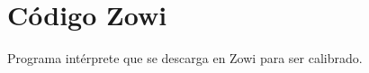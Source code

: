 
\chapter{Código Zowi} %

\label{app:zowicode} %

Programa intérprete que se descarga en Zowi para ser calibrado.

\newpage


